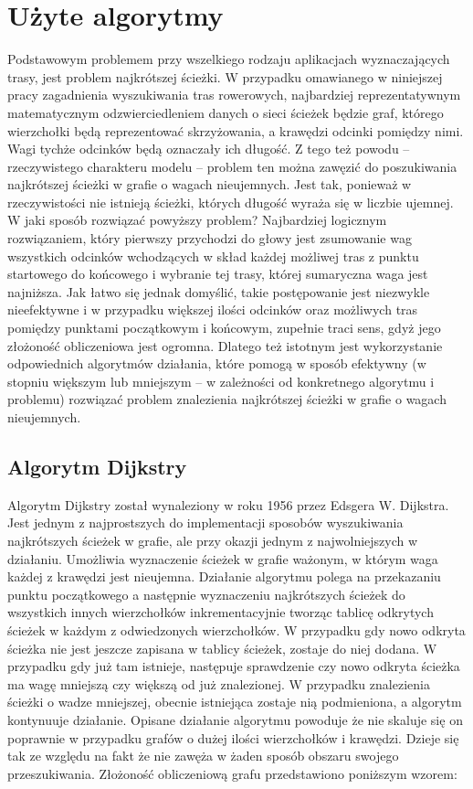 \section{Użyte algorytmy}

Podstawowym problemem przy wszelkiego rodzaju aplikacjach wyznaczających trasy, jest problem najkrótszej ścieżki. W przypadku omawianego w niniejszej pracy zagadnienia wyszukiwania tras rowerowych, najbardziej reprezentatywnym matematycznym odzwierciedleniem danych o sieci ścieżek będzie graf, którego wierzchołki będą reprezentować skrzyżowania, a krawędzi odcinki pomiędzy nimi. Wagi tychże odcinków będą oznaczały ich długość. Z tego też powodu – rzeczywistego charakteru modelu – problem ten można zawęzić do poszukiwania najkrótszej ścieżki w grafie o wagach nieujemnych. Jest tak, ponieważ w rzeczywistości nie istnieją ścieżki, których długość wyraża się w liczbie ujemnej. W jaki sposób rozwiązać powyższy problem? Najbardziej logicznym rozwiązaniem, który pierwszy przychodzi do głowy jest zsumowanie wag wszystkich odcinków wchodzących w skład każdej możliwej tras z punktu startowego do końcowego i wybranie tej trasy, której sumaryczna waga jest najniższa. Jak łatwo się jednak domyślić, takie postępowanie jest niezwykle nieefektywne i w przypadku większej ilości odcinków oraz możliwych tras pomiędzy punktami początkowym i końcowym, zupełnie traci sens, gdyż jego złożoność obliczeniowa jest ogromna. Dlatego też istotnym jest wykorzystanie odpowiednich algorytmów działania, które pomogą w sposób efektywny (w stopniu większym lub mniejszym – w zależności od konkretnego algorytmu i problemu) rozwiązać problem znalezienia najkrótszej ścieżki w grafie o wagach nieujemnych.

\subsection{Algorytm Dijkstry}

Algorytm Dijkstry został wynaleziony w roku 1956 przez Edsgera W. Dijkstra. Jest jednym z najprostszych do implementacji sposobów wyszukiwania najkrótszych ścieżek w grafie, ale przy okazji jednym z najwolniejszych w działaniu. Umożliwia wyznaczenie ścieżek w grafie ważonym, w którym waga każdej z krawędzi jest nieujemna. Działanie algorytmu polega na przekazaniu punktu początkowego a następnie wyznaczeniu najkrótszych ścieżek do wszystkich innych wierzchołków inkrementacyjnie tworząc tablicę odkrytych ścieżek w każdym z odwiedzonych wierzchołków. W przypadku gdy nowo odkryta ścieżka nie jest jeszcze zapisana w tablicy ścieżek, zostaje do niej dodana. W przypadku gdy już tam istnieje, następuje sprawdzenie czy nowo odkryta ścieżka ma wagę mniejszą czy większą od już znalezionej. W przypadku znalezienia ścieżki o wadze mniejszej, obecnie istniejąca zostaje nią podmieniona, a algorytm kontynuuje działanie.\newline
Opisane działanie algorytmu powoduje że nie skaluje się on poprawnie w przypadku grafów o dużej ilości wierzchołków i krawędzi. Dzieje się tak ze względu na fakt że nie zawęża w żaden sposób obszaru swojego przeszukiwania. Złożoność obliczeniową grafu przedstawiono poniższym wzorem:\newline

